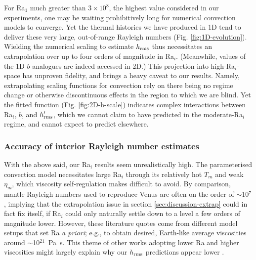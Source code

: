 For Ra$_1$ much greater than $3 \times 10^8$, the highest value considered in our experiments, one may be waiting prohibitively long for numerical convection models to converge. Yet the thermal histories we have produced in 1D tend to deliver these very large, out-of-range Rayleigh numbers (Fig. \ref{fig:1D-evolution}). Wielding the numerical scaling to estimate $h_{\rm rms}$ thus necessitates an extrapolation over up to four orders of magnitude in Ra$_i$. (Meanwhile, values of the 1D $b$ analogues are indeed accessed in 2D.) This projection into high-Ra$_i$-space has unproven fidelity, and brings a heavy caveat to our results. Namely, extrapolating scaling functions for convection rely on there being no regime change or otherwise discontinuous effects in the region to which we are blind. Yet the fitted function (Fig. \ref{fig:2D-h-scale}) indicates complex interactions between Ra$_i$, $b$, and $h_{\rm rms}^\prime$, which we cannot claim to have predicted in the moderate-Ra$_i$ regime, and cannot expect to predict elsewhere.


\subsubsection{Accuracy of interior Rayleigh number estimates} \label{sec:discussion-Ra}

With the above said, our Ra$_i$ results seem unrealistically high. The parameterised convection model necessitates large Ra$_i$ through its relatively hot $T_m$ and weak $\eta_m$, which viscosity self-regulation makes difficult to avoid. By comparison, mantle Rayleigh numbers used to reproduce Venus are often on the order of $\sim$10$^7$ \citep[e.g.,][]{kiefer_geoid_1992, kiefer_geoid_1998, vezolainen_timing_2003, vezolainen_uplift_2004, pauer_modeling_2006, smrekar_constraints_2012, noack_coupling_2012, huang_constraints_2013}, implying that the extrapolation issue in section \ref{sec:discussion-extrap} could in fact fix itself, if Ra$_i$ could only naturally settle down to a level a few orders of magnitude lower. However, these literature quotes come from different model setups that set Ra \textit{a priori}; e.g., to obtain desired, Earth-like average viscosities around $\sim$10$^{21}$~Pa~s. This theme of other works adopting lower Ra and higher viscosities might largely explain why our $h_{\rm rms}$ predictions appear lower \citep[e.g.,][]{kiefer_geoid_1992, huang_constraints_2013}.


